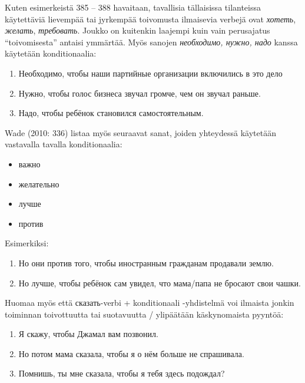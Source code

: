 \documentclass[]{scrartcl}
\providecommand{\tightlist}{%
  \setlength{\itemsep}{0pt}\setlength{\parskip}{0pt}}
\begin{document}
Kuten esimerkeistä 385 -- 388 havaitaan, tavallisia tällaisissa
tilanteissa käytettäviä lievempää tai jyrkempää toivomusta ilmaisevia
verbejä ovat \emph{хотеть}, \emph{желать}, \emph{требовать}. Joukko on
kuitenkin laajempi kuin vain perusajatus ``toivomisesta'' antaisi
ymmärtää. Myös sanojen \emph{необходимо, нужно, надо} kanssa käytetään
konditionaalia:

\begin{enumerate}
\def\labelenumi{(\arabic{enumi})}
\setcounter{enumi}{388}
\tightlist
\item
  Необходимо, чтобы наши партийные организации включились в это дело
\item
  Нужно, чтобы голос бизнеса звучал громче, чем он звучал раньше.
\item
  Надо, чтобы ребёнок становился самостоятельным.
\end{enumerate}

Wade (2010: 336) listaa myös seuraavat sanat, joiden yhteydessä
käytetään vastavalla tavalla konditionaalia:

\begin{itemize}
\tightlist
\item
  важно
\item
  желательно
\item
  лучше
\item
  против
\end{itemize}

Esimerkiksi:

\begin{enumerate}
\def\labelenumi{(\arabic{enumi})}
\setcounter{enumi}{391}
\tightlist
\item
  Но они против того, чтобы иностранным гражданам продавали землю.
\item
  Но лучше, чтобы ребёнок сам увидел, что мама/папа не бросают свои
  чашки.
\end{enumerate}

Huomaa myös että сказать-verbi + konditionaali -yhdistelmä voi ilmaista
jonkin toiminnan toivottuutta tai suotavuutta / ylipäätään käskynomaista
pyyntöä:

\begin{enumerate}
\def\labelenumi{(\arabic{enumi})}
\setcounter{enumi}{393}
\tightlist
\item
  Я скажу, чтобы Джамал вам позвонил.
\item
  Но потом мама сказала, чтобы я о нём больше не спрашивала.
\item
  Помнишь, ты мне сказала, чтобы я тебя здесь подождал?
\end{enumerate}
\end{document}
